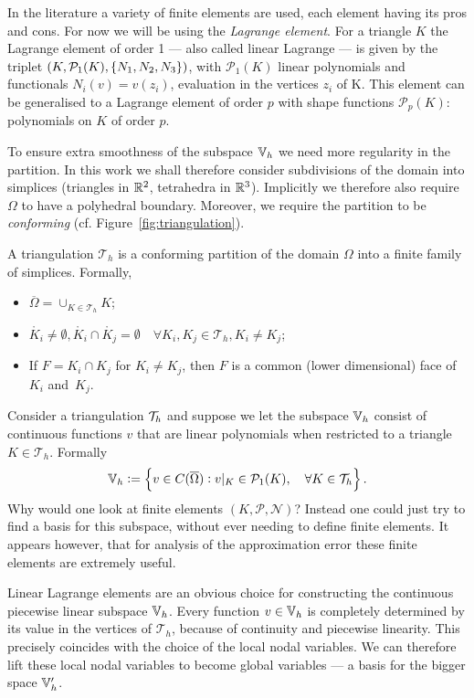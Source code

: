 \documentclass[thesis.tex]{subfiles}
\begin{document}
  In the literature a variety of finite elements are used, each element having its pros and cons. For now we will be using  the \emph{Lagrange element}.
  For a triangle $K$ the Lagrange element of order 1 --- also called linear Lagrange --- is given by the 
  triplet $(K, \mathcal{P}_1(K), \set{N_1, N_2, N_3})$, with $\mathcal{P}_1(K)$ linear polynomials and functionals $N_i(v) = v(z_i)$,
  evaluation in the vertices $z_i$ of K. This element can be generalised to a Lagrange element of order $p$ with shape functions $\mathcal{P}_p(K)$: polynomials on $K$ of order $p$.

  To ensure extra smoothness of the subspace $\mathbb{V}_h$ we need more regularity in the partition. In this work  we shall therefore consider subdivisions of the domain into simplices (triangles in $\mathbb{R}^2$, tetrahedra in $\mathbb{R}^3$). Implicitly we therefore also require $\Omega$ to have a polyhedral boundary. Moreover, we require the partition to be \emph{conforming} (cf. Figure~\ref{fig:triangulation}).
  \begin{defn}
    A triangulation $\mathcal{T}_h$ is a conforming partition of the domain $\Omega$ into a finite family of simplices.
    Formally,
    \begin{itemize}
      \item $\overline{\Omega} = \cup_{K \in \mathcal{T}_h} K$;
      \item $\mathring{K_i} \ne \emptyset, \mathring{K_i} \cap \mathring{K_j} = \emptyset \quad \forall K_i, K_j \in \mathcal{T}_h, K_i \ne K_j$;
    \item If $F = K_i \cap K_j$ for $K_i \ne K_j$, then $F$ is a common (lower dimensional) face of $K_i$ and~$K_j$.
  \end{itemize}
  \end{defn}
  Consider a triangulation $\mathcal{T}_h$ and suppose we let the subspace $\mathbb{V}_h$ consist
  of continuous functions $v$ that are linear polynomials when restricted to a triangle $K \in \mathcal{T}_h$. Formally
  \[
    \mathbb{V}_h := \set{v \in C(\overline{\Omega}) : v|_{K} \in \mathcal{P}_1(K), \quad \forall K \in \mathcal{T}_h}.
  \]
  Why
  would one look at finite elements $(K, \mathcal{P}, \mathcal{N})$? 
  Instead one could just try to find a basis for this subspace, without ever needing to define finite elements.
  It appears however, that for analysis of the approximation error these finite elements are extremely useful.

  Linear Lagrange elements are an obvious choice for constructing the continuous piecewise linear subspace $\mathbb{V}_h$.
  Every function $v \in \mathbb{V}_h$ is completely
  determined by its value in the vertices of $\mathcal{T}_h$, because of continuity and piecewise linearity.
  This precisely coincides with the choice of the local nodal variables. We can therefore lift these local nodal variables to become
  global variables --- a basis for the bigger space $\mathbb{V}_h'$.
  
\end{document}
